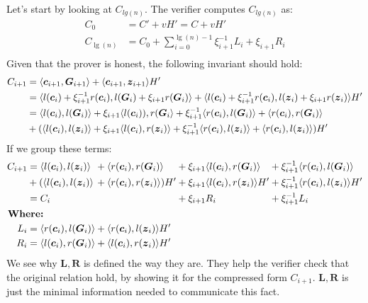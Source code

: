 \documentclass[
]{article}
\renewcommand{\vec}[1]{ \boldsymbol{#1} }
\newcommand{\ip}[2]{ \langle #1, #2 \rangle }
\begin{document}
Let's start by looking at \(C_{lg(n)}\). The verifier computes
\(C_{lg(n)}\) as: \[
\begin{aligned}
  C_0        &= C' + vH' = C + vH' \\
  C_{\lg(n)} &= C_0 + \sum^{\lg(n)-1}_{i=0} \xi^{-1}_{i+1} L_i + \xi_{i+1} R_i \\
\end{aligned}
\] Given that the prover is honest, the following invariant should hold:
\[
\begin{alignedat}[b]{1}
  C_{i+1} &= \ip{\vec{c}_{i+1}}{\vec{G}_{i+1}} + \ip{\vec{c}_{i+1}}{\vec{z}_{i+1}} H'\\ 
          &= \ip{l(\vec{c}_i) + \xi^{-1}_{i+1} r(\vec{c}_i)}{l(\vec{G}_i) + \xi_{i+1} r(\vec{G}_i)} 
            + \ip{l(\vec{c}_i) + \xi^{-1}_{i+1} r(\vec{c}_i)}{l(\vec{z}_i) + \xi_{i+1} r(\vec{z}_i)} H'\\
          &= \ip{l(\vec{c}_i)}{l(\vec{G}_i)} + \xi_{i+1} \ip{l(\vec{c}_i))}{r(\vec{G}_i}
            + \xi^{-1}_{i+1} \ip{r(\vec{c}_i)}{l(\vec{G}_i)} + \ip{r(\vec{c}_i)}{r(\vec{G}_i)}\\
          &+ (\ip{l(\vec{c}_i)}{l(\vec{z}_i)} + \xi_{i+1} \ip{l(\vec{c}_i)}{r(\vec{z}_i)} 
            + \xi^{-1}_{i+1} \ip{r(\vec{c}_i)}{l(\vec{z}_i)} + \ip{r(\vec{c}_i)}{l(\vec{z}_i)}) H'
\end{alignedat}
\] If we group these terms: \[
\begin{alignedat}[b]{4}
  C_{i+1} &= \ip{l(\vec{c}_i)}{l(\vec{z}_i)}  &&+ \ip{r(\vec{c}_i)}{r(\vec{G}_i)}     &&+ \xi_{i+1} \ip{l(\vec{c}_i)}{r(\vec{G}_i)}    &&+ \xi^{-1}_{i+1} \ip{r(\vec{c}_i)}{l(\vec{G}_i)} \\
          &+ (\ip{l(\vec{c}_i)}{l(\vec{z}_i)} &&+ \ip{r(\vec{c}_i)}{r(\vec{z}_i)}) H' &&+ \xi_{i+1} \ip{l(\vec{c}_i)}{r(\vec{z}_i)} H' &&+ \xi^{-1}_{i+1} \ip{r(\vec{c}_i)}{l(\vec{z}_i)} H' \\
          &= C_i                              &&                                      &&+ \xi_{i+1} R_i                                &&+ \xi^{-1}_{i+1} L_i \\
          &\mkern-18mu\mkern-18mu \textbf{Where:} && && && \\
  L_i     &= \ip{r(\vec{c}_i)}{l(\vec{G}_i)} &&+ \ip{r(\vec{c}_i)}{l(\vec{z}_i)} H' && && \\
  R_i     &= \ip{l(\vec{c}_i)}{r(\vec{G}_i)} &&+ \ip{l(\vec{c}_i)}{r(\vec{z}_i)} H' && && 
\end{alignedat}
\] We see why \(\vec{L}, \vec{R}\) is defined the way they are. They
help the verifier check that the original relation hold, by showing it
for the compressed form \(C_{i+1}\). \(\vec{L}, \vec{R}\) is just the
minimal information needed to communicate this fact.
\end{document}
